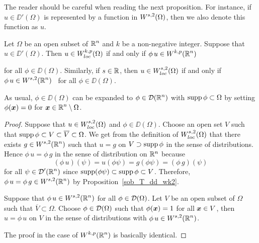 The reader should be careful when reading the next proposition.  For
instance, if $u \in \DD'(\Omega)$ is represented by a function in
$\displaystyle W^{s,2}(\Omega)$, then we also denote this function as
$u$.

\begin{prop} \label{sob_Hsloc_cond}
Let $\Omega$ be an open subset of $\displaystyle \mathbb{R}^n$ and $k$ be a
non-negative integer.  Suppose that $u \in \DD'(\Omega)$.  Then
$\displaystyle u \in W^{k,p}_{loc}(\Omega)$ if and only if
$\displaystyle \phi \, u \in W^{k,p}(\mathbb{R}^n)$
\footnotemark\addtocounter{footnote}{-1}
for all $\phi \in \DD(\Omega)$.
Similarly, if $s \in \mathbb{R}$, then $\displaystyle u \in W^{s,2}_{loc}(\Omega)$
if and only if $\displaystyle \phi \, u \in W^{s,2}(\mathbb{R}^n)$
\footnotemark\ for all $\phi \in \DD(\Omega)$.
\end{prop}

\begin{rmk}
As usual, $\phi \in \DD(\Omega)$ can be expanded to
$\displaystyle \phi \in \mathcal{D}(\mathbb{R}^n)$ with $\operatorname{supp} \phi \subset \Omega$
by setting $\phi({\bm{x}}) = 0$ for
$\displaystyle {\bm{x}} \in \mathbb{R}^n\setminus \Omega$.
\end{rmk}


\begin{proof}
Suppose that $\displaystyle u \in W^{s,2}_{loc}(\Omega)$ and
$\phi \in \DD(\Omega)$.  Choose an open set $V$ such that
$\displaystyle \operatorname{supp} \phi \subset V \subset \overline{V}\subset \Omega$.
We get from the definition of $\displaystyle W^{s,2}_{loc}(\Omega)$
that there exists $\displaystyle g\in W^{s,2}(\mathbb{R}^n)$ such that $u=g$ on
$V \supset \operatorname{supp} \phi$ in the sense of distributions.  Hence
$\phi\, u = \phi \, g$ in the sense of distribution on $\mathbb{R}^n$ because
\[
  (\phi \, u)(\psi) = u(\phi\psi) = g(\phi\psi) = (\phi\,g)(\psi)
\]
for all $\displaystyle \psi \in \mathcal{D}'(\mathbb{R}^n)$ since
$\operatorname{supp}(\phi\psi) \subset \operatorname{supp}
\phi \subset V$.  Therefore,
$\displaystyle \phi\, u = \phi \, g \in W^{s,2}(\mathbb{R}^n)$ by
Proposition~\ref{sob_T_dd_wk2}.

Suppose that $\displaystyle \phi\,u \in W^{s,2}(\mathbb{R}^n)$ for all
$\displaystyle \phi\in \mathcal{D}(\Omega)$.  Let $V$ be an open
subset of $\Omega$ such that $\overline{V}\subset \Omega$.  Choose
$\displaystyle \phi \in \mathcal{D}(\Omega)$ such that $\phi({\bm{x}})=1$ for all
${\bm{x}} \in V$, then $u = \phi \, u$ on $V$ in the sense of
distributions with $\displaystyle \phi \, u \in W^{s,2}(\mathbb{R}^n)$.

 The proof in the case of $\displaystyle W^{k,p}(\mathbb{R}^n)$ is
basically identical.
\end{proof}

